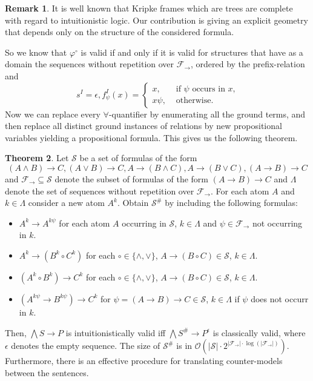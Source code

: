 \documentclass[a4paper,11pt]{report}
\theoremstyle{definition}
\newtheorem{theorem}{Theorem}[section]
\theoremstyle{definition}
\theoremstyle{definition}
\theoremstyle{definition}
\theoremstyle{definition}
\theoremstyle{definition}
\theoremstyle{definition}
\newtheorem{remark}[theorem]{Remark}
\begin{document}
	\begin{remark}
		It is well known that Kripke frames which are trees are complete with regard to intuitionistic logic. Our contribution is giving an explicit geometry that depends only on the structure of the considered formula.
	\end{remark}
	
	
	So we know that $\varphi^\circ$ is valid if and only if it is valid for structures that have as a domain the sequences without repetition over $\mathcal F_\to$, ordered by the prefix-relation and $$s^I = \epsilon, f_\psi^I(x) = \begin{cases}
		x, &\text{ if $\psi$ occurs in $x$,}\\
		x\psi, &\text{ otherwise.}
	\end{cases}$$
	Now we can replace every $\forall$-quantifier by enumerating all the ground terms, and then replace all distinct ground instances of relations by new propositional variables yielding a propositional formula. This gives us the following theorem.
	
	\begin{theorem}
		Let $\mathcal S$ be a set of formulas of the form
		$$(A\wedge B)\to C, (A\vee B)\to C, A\to (B\wedge C), A\to(B\vee C), (A\to B)\to C$$
		and $\mathcal F_\to\subseteq\mathcal S$ denote the subset of formulas of the form $(A\to B)\to C$ and $\Lambda$ denote the set of sequences without repetition over $\mathcal F_\to$. For each atom $A$ and $k\in\Lambda$ consider a new atom $A^k$. Obtain $\mathcal S^\#$ by including the following formulas:
		\begin{itemize}
			\item $A^k\to A^{k\psi}$ for each atom $A$ occurring in $\mathcal S$, $k\in\Lambda$ and $\psi\in\mathcal F_\to$ not occurring in $k$.
			\item $A^k\to (B^k\circ C^k)$ for each $\circ\in\{\wedge,\vee\}$, $A\to (B\circ C)\in\mathcal S$, $k\in\Lambda$.
			\item $(A^k\circ B^k)\to C^k$ for each $\circ\in\{\wedge,\vee\}$, $A\to (B\circ C)\in\mathcal S$, $k\in\Lambda$.
			\item $(A^{k\psi}\to B^{k\psi})\to C^k$ for $\psi = (A\to B)\to C\in\mathcal S$, $k\in\Lambda$ if $\psi$ does not occurr in $k$.
		\end{itemize}
		Then, $\bigwedge S\to P$ is intuitionistically valid iff $\bigwedge S^\#\to P^\epsilon$ is classically valid, where $\epsilon$ denotes the empty sequence. The size of $\mathcal S^\#$ is in $\mathcal O(|\mathcal S|\cdot2^{|\mathcal F_\to|\cdot\log(|\mathcal F_\to|)})$. Furthermore, there is an effective procedure for translating counter-models between the sentences.
	\end{theorem}
\end{document}

